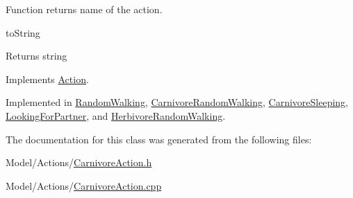 Function returns name of the action. 

to\+String \begin{DoxyReturn}{Returns}
string 
\end{DoxyReturn}


Implements \hyperlink{class_action_a752a31c122f369e92c3e09cdc1a6d617}{Action}.



Implemented in \hyperlink{class_random_walking_a86f089cc5cc28d179e248c67477e8b30}{Random\+Walking}, \hyperlink{class_carnivore_random_walking_ae34e8070f9ac8826bb08141c43adcaf5}{Carnivore\+Random\+Walking}, \hyperlink{class_carnivore_sleeping_a2805a35db94114af285978b9820f0f18}{Carnivore\+Sleeping}, \hyperlink{class_looking_for_partner_a83ef295e8ae6ff29521e0225683bf0af}{Looking\+For\+Partner}, and \hyperlink{class_herbivore_random_walking_a27a17f1ee3d5df3103f3348523c4801a}{Herbivore\+Random\+Walking}.



The documentation for this class was generated from the following files\+:\begin{DoxyCompactItemize}
\item 
Model/\+Actions/\hyperlink{_carnivore_action_8h}{Carnivore\+Action.\+h}\item 
Model/\+Actions/\hyperlink{_carnivore_action_8cpp}{Carnivore\+Action.\+cpp}\end{DoxyCompactItemize}
